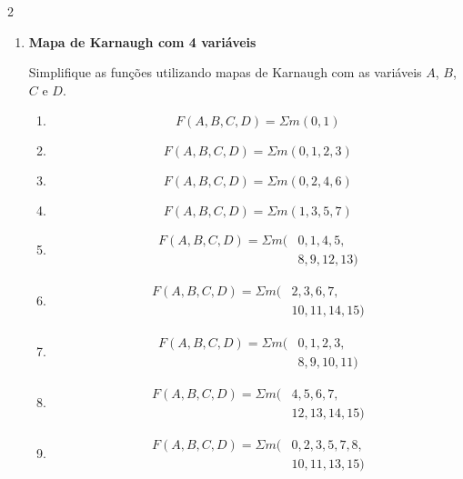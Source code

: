 \documentclass[a4paper,12pt]{article}
\begin{document}
\begin{multicols}{2}
\begin{enumerate}[leftmargin=*]

\item \textbf{Mapa de Karnaugh com 4 variáveis}

Simplifique as funções utilizando mapas de Karnaugh com as variáveis
$A$, $B$, $C$ e $D$.

\begin{enumerate}[label=(\Alph*)]

    \item
    \[
        F(A,B,C,D)=\Sigma m(0,1)
    \]

    \item
    \[
        F(A,B,C,D)=\Sigma m(0,1,2,3)
    \]

    \item
    \[
        F(A,B,C,D)=\Sigma m(0,2,4,6)
    \]

    \item
    \[
        F(A,B,C,D)=\Sigma m(1,3,5,7)
    \]

    \item
    \[
    \begin{aligned}
        F(A,B,C,D) = \Sigma m(&0,1,4,5,\\
                              &8,9,12,13)
    \end{aligned}
    \]

    \item
    \[
    \begin{aligned}
        F(A,B,C,D) = \Sigma m(&2,3,6,7,\\
                              &10,11,14,15)
    \end{aligned}
    \]

    \item
    \[
    \begin{aligned}
        F(A,B,C,D) = \Sigma m(&0,1,2,3,\\
                              &8,9,10,11)
    \end{aligned}
    \]

    \item
    \[
    \begin{aligned}
        F(A,B,C,D) = \Sigma m(&4,5,6,7,\\
                              &12,13,14,15)
    \end{aligned}
    \]


    \item
    \[
    \begin{aligned}
        F(A,B,C,D) = \Sigma m(&0,2,3,5,7,8,\\
                              &10,11,13,15)
    \end{aligned}
    \]



\end{enumerate}
\end{enumerate}
\end{multicols}
\end{document}
